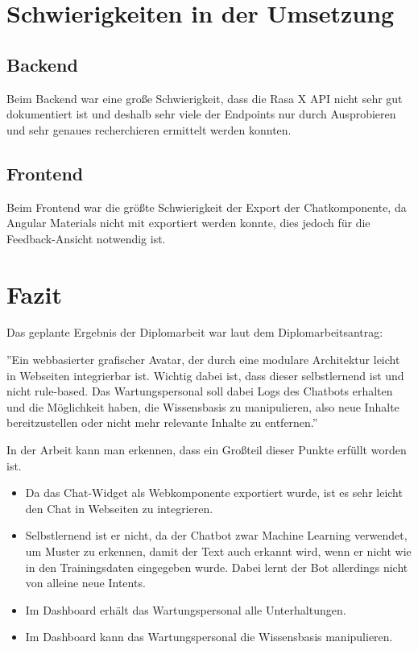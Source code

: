 \section{Schwierigkeiten in der Umsetzung}

\subsection{Backend}
Beim Backend war eine große Schwierigkeit, dass die Rasa X API nicht sehr gut dokumentiert ist und deshalb sehr viele der Endpoints nur durch Ausprobieren und sehr genaues recherchieren ermittelt werden konnten.


\subsection{Frontend}
Beim Frontend war die größte Schwierigkeit der Export der Chatkomponente, da Angular Materials nicht mit exportiert werden konnte, dies jedoch für die Feedback-Ansicht notwendig ist.

\section{Fazit}
Das geplante Ergebnis der Diplomarbeit war laut dem Diplomarbeitsantrag:

''Ein webbasierter grafischer Avatar, der durch eine modulare Architektur leicht in Webseiten integrierbar ist.
Wichtig dabei ist, dass dieser selbstlernend ist und nicht rule-based.
Das Wartungspersonal soll dabei Logs des Chatbots erhalten und die Möglichkeit haben, die Wissensbasis zu manipulieren, also neue Inhalte bereitzustellen oder nicht mehr relevante Inhalte zu entfernen.''

In der Arbeit kann man erkennen, dass ein Großteil dieser Punkte erfüllt worden ist.

\begin{itemize}
    \item Da das Chat-Widget als Webkomponente exportiert wurde, ist es sehr leicht den Chat in Webseiten zu integrieren.
    \item Selbstlernend ist er nicht, da der Chatbot zwar Machine Learning verwendet, um Muster zu erkennen, damit der Text auch erkannt wird, wenn er nicht wie in den Trainingsdaten eingegeben wurde.
    Dabei lernt der Bot allerdings nicht von alleine neue Intents.
    \item Im Dashboard erhält das Wartungspersonal alle Unterhaltungen.
    \item Im Dashboard kann das Wartungspersonal die Wissensbasis manipulieren.
\end{itemize}

